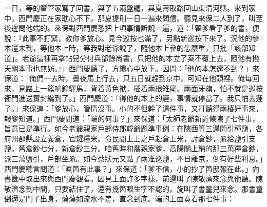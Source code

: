 一日，等的翟管家寫了回書，與了五兩盤纏，與夏壽取路回山東清河縣。來到家中，西門慶正在家耽心不下，那夏提刑一日一遍來問信。聽見來保二人到了，叫至後邊問他端的。來保對西門慶悉把上項事情訴說一遍，道：「翟爹看了爹的書，便說：『此事不打緊，教你爹放心。見今巡按也滿了，另點新巡按下來了。況他的參本還未到，等他本上時，等我對老爺說了，隨他本上參的怎麼重，只批「該部知道」。老爺這裡再拿帖兒分付兵部餘尚書，只把他的本立了案不覆上去，隨他有撥天關本事也無妨。』」西門慶聽了，方纔心中放下。因問：「他的本怎還不到？」來保道：「俺們一去時，晝夜馬上行去，只五日就趕到京中，可知在他頭裡。俺每回來，見路上一簇响鈴驛馬，背着黃色袱，插着兩根雉尾、兩面牙旗，怕不就是巡按衙門進送實封纔到了。」西門慶道：「得他的本上的遲，事情就停當了。我只怕去遲了。」來保道：「爹放心，管情沒事。小的不但幹了這件事，又打聽得兩樁好事來，報爹知道。」西門慶問道：「端的何事？」來保道：「太師老爺新近條陳了七件事，旨意已是準行。如今老爺親家戶部侍郎韓爺題準事例：在陝西等三邊開引種鹽，各府州郡縣設立義倉，官糶糧米。令民間上上之戶赴倉上米，討倉鈔，派給鹽引支鹽。舊倉鈔七分，新倉鈔三分。咱舊時和喬親家爹，高陽關上納的那三萬糧倉鈔，派三萬鹽引，戶部坐派。如今蔡狀元又點了兩淮巡鹽，不日離京，倒有好些利息。」{}西門慶聽言問道：「眞箇有此事？」來保道：「爹不信，小的抄了箇邸報在此。」向書篋中取出來與西門慶觀看。因見上面許多字樣，前邊叫了陳敬濟來念與他聽。陳敬濟念到中間，只要結住了，還有幾箇眼生字不認的。旋叫了書童兒來念。那書童倒還是門子出身，蕩蕩如流水不差，直念到底。端的上面奏着那七件事：

